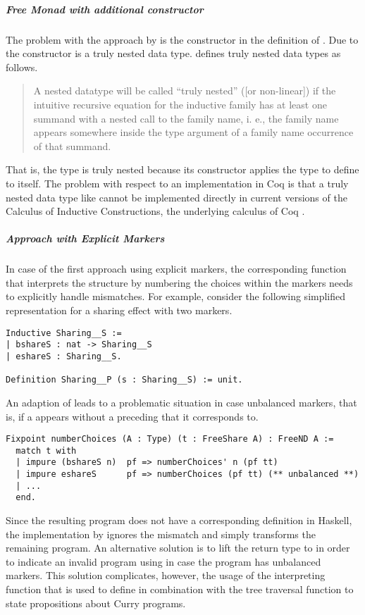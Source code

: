 \subparagraph{Free Monad with additional constructor}
The problem with the approach by \citeauthor{pirog2018syntax} is the
 constructor in the definition of .
Due to the  constructor  is a truly nested data
type.
\citet{matthes2008recursion} defines truly nested data types as
follows.

\begin{quote}
A nested datatype will be called “truly nested” ([or non-linear]) if
the intuitive recursive equation for the inductive family has at least
one summand with a nested call to the family name, i. e., the family
name appears somewhere inside the type argument of a family name
occurrence of that summand.
\end{quote}

That is, the type  is truly nested because its constructor
 applies the type to define to itself.
The problem with respect to an implementation in Coq is that a truly
nested data type like  cannot be implemented directly in
current versions of the Calculus of Inductive Constructions, the
underlying calculus of Coq \citep{matthes2008recursion}.

\subparagraph{Approach with Explicit Markers}
In case of the first approach using explicit markers, the
corresponding function that interprets the  structure by
numbering the choices within the markers needs to explicitly handle
mismatches.
For example, consider the following simplified representation for a
sharing effect with two markers.

\begin{verbatim}
Inductive Sharing__S :=
| bshareS : nat -> Sharing__S
| eshareS : Sharing__S.

Definition Sharing__P (s : Sharing__S) := unit.
\end{verbatim}

An adaption of  leads to a problematic situation
in case unbalanced markers, that is, if a  appears
without a preceding  that it corresponds to.

\begin{verbatim}
Fixpoint numberChoices (A : Type) (t : FreeShare A) : FreeND A :=
  match t with
  | impure (bshareS n)  pf => numberChoices' n (pf tt)
  | impure eshareS      pf => numberChoices (pf tt) (** unbalanced **)
  | ...
  end.
\end{verbatim}

Since the resulting program does not have a corresponding definition
in Haskell, the implementation by \citeauthor{bunkenburg2019modeling}
ignores the mismatch and simply transforms the remaining program.
An alternative solution is to lift the return type to  in
order to indicate an invalid program using  in case the
program has unbalanced markers.
This solution complicates, however, the usage of the interpreting
function  that is used to define in combination
with the tree traversal function  to state propositions
about Curry programs.

